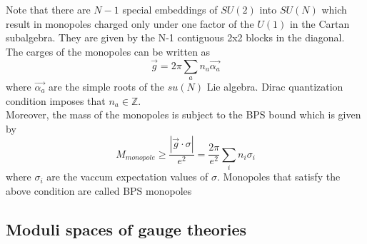 Note that there are $N-1$ special embeddings of $SU(2)$ into $SU(N)$ which result in monopoles charged only under one factor of the $U(1)$ in the Cartan subalgebra. They are given by the N-1 contiguous 2x2 blocks in the diagonal.\\
The carges of the monopoles can be written as
\begin{equation}
\vec{g}  = 2 \pi \sum_a n_a \vec{\alpha_a}
\end{equation}
where $\vec{\alpha_a}$ are the simple roots of the $su(N)$ Lie algebra. Dirac quantization condition imposes that $n_a \in \mathbb{Z}$.\\
Moreover, the mass of the monopoles is subject to the BPS bound which is given by
\begin{equation}
M_{monopole} \geq \frac{| \vec{g} \cdot \sigma| }{e^2} = \frac{2 \pi}{e^2} \sum_i n_i \sigma_i
\end{equation}
where $\sigma_i$ are the vaccum expectation values of $\sigma$.
Monopoles that satisfy the above condition are called BPS monopoles 
 
 
 
 
 
 \subsection{Moduli spaces of gauge theories}


